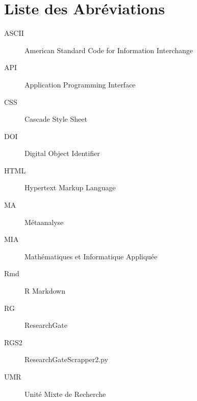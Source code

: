 \documentclass{book}
\begin{document}
\newpage
{}
\chapter*{Liste des Abréviations}

\begin{description}
    \item[ASCII] American Standard Code for Information Interchange
    \item[API] Application Programming Interface
    \item[CSS] Cascade Style Sheet
    \item[DOI] Digital Object Identifier
    \item[HTML] Hypertext Markup Language
    \item[MA] Métaanalyse
    \item[MIA] Mathématiques et Informatique Appliquée
    \item[Rmd] R Markdown
    \item[RG] ResearchGate
    \item[RGS2] ResearchGateScrapper2.py
    \item[UMR] Unité Mixte de Recherche

\end{description}
\thispagestyle{fancy}


\newpage
\mbox{} %
\thispagestyle{fancy}


\newpage
{}
\end{document}
